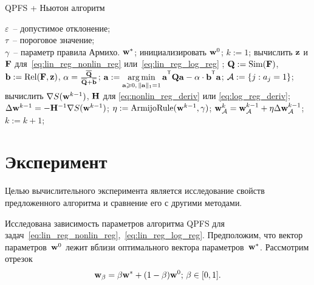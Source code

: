 \begin{algorithm}
	\caption{QPFS + Ньютон алгоритм}
	\label{pc:QPFSNewton}
	\begin{algorithmic}
		\REQUIRE $\varepsilon$~-- допустимое отклонение;\\
		\hspace{1.07cm}$\tau$~-- пороговое значение;\\
		\hspace{1.07cm}$\gamma$~-- параметр правила Армихо.
		\ENSURE $\mathbf{w}^*$;
		\STATE  инициализировать $\mathbf{w}^0$;
		\STATE $k := 1$;
		\REPEAT
		\STATE вычислить $\mathbf{z}$ и $\mathbf{F}$ для~\eqref{eq:lin_reg_nonlin_reg} или~\eqref{eq:lin_reg_log_reg} ;
		\vspace{0.1cm}
		\STATE $\mathbf{Q} := \text{Sim} (\mathbf{F})$, $\mathbf{b} := \text{Rel}(\mathbf{F}, \mathbf{z})$, $\alpha = \frac{\overline{\mathbf{Q}}}{\overline{\mathbf{Q}} + \overline{\mathbf{b}}}$;
		\vspace{0.1cm}
		\STATE $\ba := \argmin_{\ba \geq 0, \, \|\ba\|_1=1}\ba^{\T} \bQ \ba - \alpha \cdot \mathbf{b}^{\T} \ba$;
		\vspace{0.1cm}
		\STATE $\mathcal{A} := \{j: a_j = 1\}$;
		\vspace{0.1cm}
		\STATE вычислить $\nabla S(\mathbf{w}^{k-1})$, $\mathbf{H}$ для \eqref{eq:nonlin_reg_deriv} или \eqref{eq:log_reg_deriv};
		\vspace{0.1cm}
		\STATE $\Delta \mathbf{w}^{k-1} = - \mathbf{H}^{-1} \nabla S(\mathbf{w}^{k-1})$;
		\vspace{0.1cm}
		\STATE $\eta := \text{ArmijoRule}(\mathbf{w}^{k-1}, \gamma)$;
		\vspace{0.1cm}
		\STATE $\mathbf{w}_{\mathcal{A}}^k = \mathbf{w}_{\mathcal{A}}^{k - 1} + \eta \Delta \mathbf{w}_{\mathcal{A}}^{k - 1}$;
		\vspace{0.1cm}
		\STATE $k := k + 1$;
		\vspace{0.1cm}
	\end{algorithmic}
\end{algorithm}


  \section*{Эксперимент}
  Целью вычислительного эксперимента является исследование свойств предложенного алгоритма и сравнение его с другими методами. 
  
  Исследована зависимость параметров алгоритма QPFS для задач~\eqref{eq:lin_reg_nonlin_reg},~\eqref{eq:lin_reg_log_reg}. 
  Предположим, что вектор параметров~$\mathbf{w}^0$ лежит вблизи оптимального вектора параметров~$\mathbf{w}^*$. 
  Рассмотрим отрезок
\[
\mathbf{w}_{\beta} = \beta \mathbf{w}^* + (1 - \beta) \mathbf{w}^0; \, \beta \in [0, 1] .
\]

